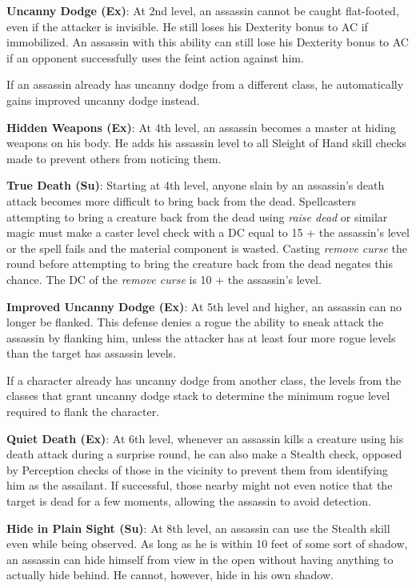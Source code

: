 \textbf{Uncanny Dodge (Ex)}: At 2nd level, an assassin cannot be caught flat-footed, even if the attacker is invisible. He still loses his Dexterity bonus to AC if immobilized. An assassin with this ability can still lose his Dexterity bonus to AC if an opponent successfully uses the feint action against him.
				
If an assassin already has uncanny dodge from a different class, he automatically gains improved uncanny dodge instead.
				
\textbf{Hidden Weapons (Ex)}: At 4th level, an assassin becomes a master at hiding weapons on his body. He adds his assassin level to all Sleight of Hand skill checks made to prevent others from noticing them.
				
\textbf{True Death (Su)}: Starting at 4th level, anyone slain by an assassin's death attack becomes more difficult to bring back from the dead. Spellcasters attempting to bring a creature back from the dead using \textit{raise dead} or similar magic must make a caster level check with a DC equal to 15 + the assassin's level or the spell fails and the material component is wasted. Casting \textit{remove curse} the round before attempting to bring the creature back from the dead negates this chance. The DC of the \textit{remove curse} is 10 + the assassin's level.
				
\textbf{Improved Uncanny Dodge (Ex)}: At 5th level and higher, an assassin can no longer be flanked. This defense denies a rogue the ability to sneak attack the assassin by flanking him, unless the attacker has at least four more rogue levels than the target has assassin levels.
				
If a character already has uncanny dodge from another class, the levels from the classes that grant uncanny dodge stack to determine the minimum rogue level required to flank the character.
				
\textbf{Quiet Death (Ex)}: At 6th level, whenever an assassin kills a creature using his death attack during a surprise round, he can also make a Stealth check, opposed by Perception checks of those in the vicinity to prevent them from identifying him as the assailant. If successful, those nearby might not even notice that the target is dead for a few moments, allowing the assassin to avoid detection. 
				
\textbf{Hide in Plain Sight (Su)}: At 8th level, an assassin can use the Stealth skill even while being observed. As long as he is within 10 feet of some sort of shadow, an assassin can hide himself from view in the open without having anything to actually hide behind. He cannot, however, hide in his own shadow.
				
